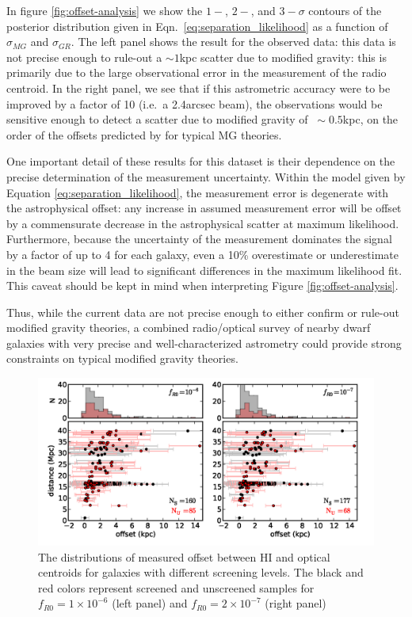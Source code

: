 \documentclass[useAMS,usenatbib,twocolumn]{mn2e}
\begin{document}
In figure \ref{fig:offset-analysis} we show the $1-$, $2-$, and $3-\sigma$
contours
of the posterior distribution given in Eqn.~\ref{eq:separation_likelihood}
as a function of $\sigma_{MG}$ and $\sigma_{GR}$.  The left panel shows the
result for the observed data: this data is
not precise enough to rule-out a $\sim 1$kpc scatter due to modified
gravity: this is primarily due to the large observational error in the
measurement of the radio centroid.  In the right panel, we see that
if this astrometric accuracy were to be improved by a factor of 10
(i.e.\ a 2.4arcsec beam),
the observations would be sensitive enough to detect a scatter due to
modified gravity of $~\sim 0.5$kpc, on the order of the offsets
predicted by \citep{bhuvjake2011} for typical MG theories.

One important detail of these results for this dataset is their dependence on
the precise determination of the measurement uncertainty.  Within the model
given by Equation \ref{eq:separation_likelihood}, the measurement error is
degenerate with the astrophysical offset: any increase in assumed measurement
error will be offset by a commensurate decrease in the astrophysical scatter
at maximum likelihood.  Furthermore, because the uncertainty of the measurement
dominates the signal by a factor of up to 4 for each galaxy, even a 10\%
overestimate or underestimate in the beam size will lead to significant
differences in the maximum likelihood fit.  This caveat should be kept in
mind when interpreting Figure \ref{fig:offset-analysis}.

Thus, while the current data are not precise enough to either confirm or
rule-out modified gravity theories, a combined radio/optical survey of
nearby dwarf galaxies with very precise and well-characterized astrometry
could provide strong constraints on typical modified
gravity theories.


\begin{figure}
\centering
\includegraphics[scale=0.25]{figures/Offset_HI_optical_scatter_jake.png}

\caption{The distributions of measured offset between HI and
optical centroids for galaxies with different screening levels.
The black and red colors represent screened and unscreened samples for
$f_{R0}=1\times10^{-6}$ (left panel) and $f_{R0}=2\times10^{-7}$ (right panel)}
\label{fig:offset}
\end{figure}
\end{document}
